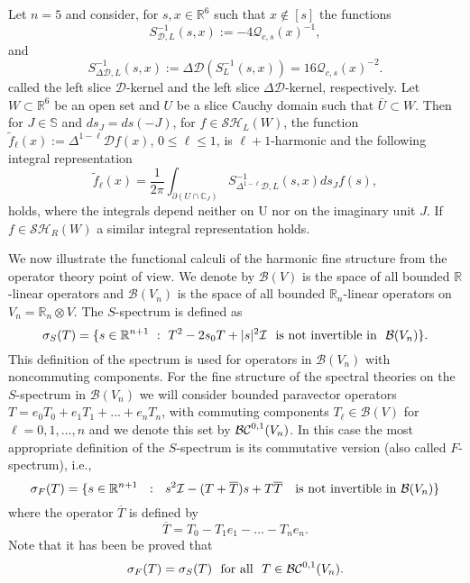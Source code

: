 \documentclass[reqno,11pt]{amsart}
\numberwithin{equation}{section}
\newcommand{\bigD}{\mathcal{D}}
\theoremstyle{definition}
\begin{document}
\medskip
Let $n=5$ and consider,
for  $s,x \in \mathbb{R}^6$ such that $x \notin [s]$ the functions
\begin{equation}
		S^{-1}_{\bigD ,L}(s,x):=-4 \mathcal{Q}_{c,s}(x)^{-1},
	\end{equation}
	 and
	\begin{equation}
S^{-1}_{\Delta\bigD ,L}(s,x):=\Delta \mathcal{D} \left(S^{-1}_L(s,x)\right)=16 \mathcal{Q}_{c,s}(x)^{-2}.
	\end{equation}
called the left slice $ \mathcal{D}$-kernel and the left slice  $ \Delta\mathcal{D}$-kernel, respectively.
Let $W \subset \mathbb{R}^6$ be an open set and $U$ be a slice Cauchy domain such that $\bar{U} \subset W$.
Then for $J \in \mathbb{S}$ and $ds_J=ds(-J)$, for  $f \in \mathcal{SH}_L(W)$,
 the function $ \tilde{f}_\ell(x):=\Delta^{1-\ell} \mathcal{D}f(x)$, $0 \leq \ell  \leq 1$, is $\ell+1$-harmonic and the following integral representation
		$$ \tilde{f}_\ell(x)= \frac{1}{2\pi} \int_{\partial(U \cap \mathbb{C}_J)} S^{-1}_{\Delta^{1-\ell}\mathcal D,L}(s,x) ds_J f(s),$$
holds, where
the integrals depend neither on U nor on the imaginary unit $J$.
If $f \in \mathcal{SH}_R(W)$
a similar integral representation holds.
		

\medskip
We now illustrate the functional calculi of the harmonic fine structure from the operator theory point of view.
We denote by
$\mathcal{B}(V)$ is the space of all bounded $\mathbb{R}$-linear operators
and $\mathcal{B}(V_n)$ is the space of all bounded $\mathbb{R}_n$-linear operators
on $V_n=\mathbb{R}_n\otimes V$.
The $S$-spectrum is defined as
$$
\sigma_S(T)=\{ s\in \mathbb{R}^{n+1}\ : \ T^2-2s_0T+|s|^2\mathcal{I}\ \ {\rm is \ not\ invertible\ in}\ \  \mathcal{B}(V_n)\}.
$$
This definition of the spectrum is used for operators in $\mathcal{B}(V_n)$ with noncommuting components.
For the fine structure of the spectral theories on the $S$-spectrum
in $\mathcal{B}(V_n)$ we will consider bounded paravector operators
$T=e_0T_0+e_1T_1+...+e_n T_n$, with commuting components $T_\ell\in\mathcal{B}(V)$ for $\ell=0,1,\ldots ,n$
and we denote this set by $\mathcal{BC}^{\small 0,1}(V_n)$.
In this case the most appropriate definition of the $S$-spectrum is its commutative version (also called $F$-spectrum), i.e.,
$$
\sigma_F(T)=\{ s\in \mathbb{R}^{n+1}\ \ :\ \ s^2\mathcal{I}-(T+\overline{T})s +T\overline{T}\ \ \
{\rm is\ not\  invertible\ in \ }\mathcal{B}(V_n)\}
$$
where the operator $\overline{T}$ is defined by
$$
\overline{T}=T_0-T_1e_1 - \dots  - T_n e_n.
$$
Note that it has been be proved that
$$
\sigma_F(T)=\sigma_S(T) \ \  {\rm for\ all} \ \  T\in \mathcal{BC}^{\small 0,1}(V_n).
$$
\end{document}

